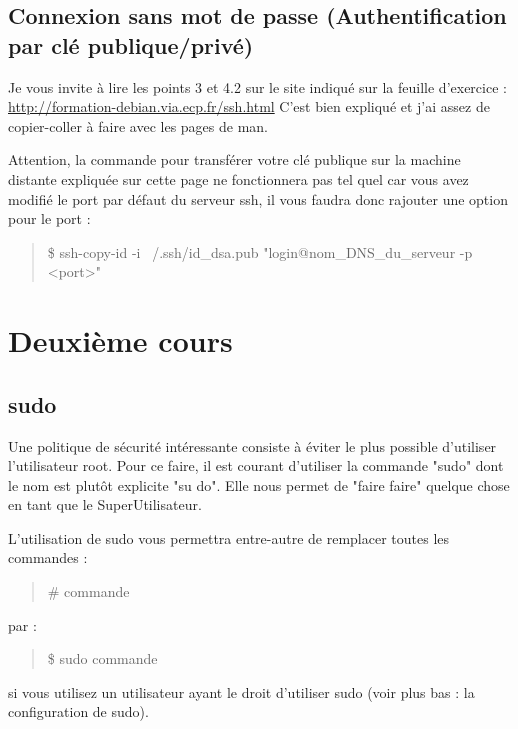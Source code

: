 \documentclass[a4paper,11pt]{article}
\newcommand{\commande}[1] {
    \begin{quote}
    \tt\raggedright #1 
    \end{quote}
}
\begin{document}
\subsection{Connexion sans mot de passe (Authentification par clé publique/privé)}
\par Je vous invite à lire les points 3 et 4.2 sur le site indiqué sur la feuille d'exercice : \\
\url{http://formation-debian.via.ecp.fr/ssh.html} C'est bien expliqué et j'ai assez de copier-coller à faire avec les pages de man.
\par Attention, la commande pour transférer votre clé publique sur la machine distante expliquée sur cette page ne fonctionnera pas tel quel car vous avez modifié le port par défaut du serveur ssh, il vous faudra donc rajouter une option pour le port :
\commande{\$ ssh-copy-id -i ~/.ssh/id\_dsa.pub "login@nom\_DNS\_du\_serveur -p <port>"}

\section{Deuxième cours}
\subsection{sudo}
\par Une politique de sécurité intéressante consiste à éviter le plus possible d'utiliser l'utilisateur root. Pour ce faire, il est courant d'utiliser la commande "sudo" dont le nom est plutôt explicite "su do". Elle nous permet de "faire faire" quelque chose en tant que le SuperUtilisateur.
\par L'utilisation de sudo vous permettra entre-autre de remplacer toutes les commandes :
\commande{\# commande}
par :
\commande{\$ sudo commande}
si vous utilisez un utilisateur ayant le droit d'utiliser sudo (voir plus bas : la configuration de sudo).
\end{document}
